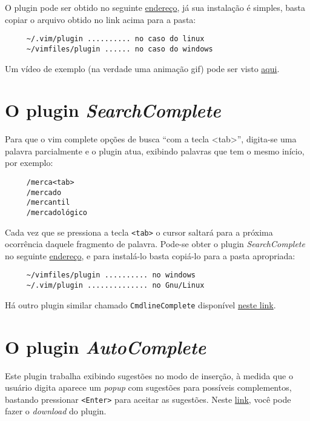 O plugin pode ser obtido no seguinte
\href{http://www.vim.org/scripts/script.php?script\_id=2438#0.9}{endereço}, já sua instalação
é simples, basta copiar o arquivo obtido no link acima para a pasta:
   
\begin{verbatim}
     ~/.vim/plugin .......... no caso do linux
     ~/vimfiles/plugin ...... no caso do windows
\end{verbatim}

Um vídeo de exemplo (na verdade uma animação gif) pode ser visto
\href{http://downloads.veryspeedy.net/vim/EasyGrep.gif}{aqui}.

\section{O plugin {\em SearchComplete}}
Para que o vim complete opções de busca ``com a tecla <tab>'', digita-se uma
palavra parcialmente e o plugin atua, exibindo palavras que tem 
o mesmo início, por exemplo:

\begin{verbatim}
     /merca<tab>
     /mercado
     /mercantil
     /mercadológico
\end{verbatim}

Cada vez que se pressiona a tecla {\tt <tab>} o cursor saltará para 
a próxima ocorrência daquele fragmento de palavra.
Pode-se obter o plugin {\em SearchComplete} no seguinte 
\href{http://www.vim.org/scripts/script.php?script\_id=474}{endereço}, 
e para instalá-lo basta copiá-lo para a pasta apropriada:
    
\begin{verbatim}
     ~/vimfiles/plugin .......... no windows
     ~/.vim/plugin .............. no Gnu/Linux
\end{verbatim}

Há outro plugin similar chamado {\tt CmdlineComplete} disponível  
\href{http://www.vim.org/scripts/script.php?script\_id=2222}{neste link}.


\section{O plugin {\em AutoComplete}}\label{sec:O Plugin AutoComplete}
Este plugin trabalha exibindo sugestões no modo de inserção, à
medida que o usuário digita aparece um {\em popup} com sugestões para possíveis
complementos, bastando pressionar {\tt <Enter>} para aceitar as sugestões.
Neste \href{http://www.vim.org/scripts/script.php?script\_id=1879}{link}, você pode
fazer o {\em download} do plugin.

